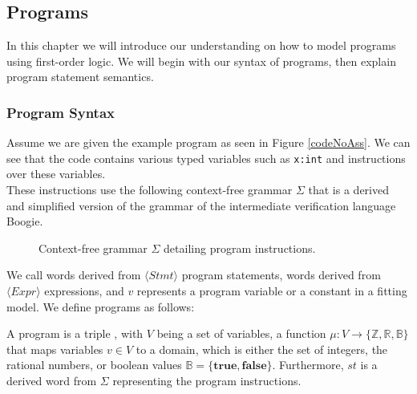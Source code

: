 \subsection{Programs}
In this chapter we will introduce our understanding on how to model programs using first-order logic. We will begin with our syntax of programs, then explain program statement semantics.

\subsubsection{Program Syntax}
Assume we are given the example program as seen in Figure \ref{codeNoAss}. We can see that the code contains various typed variables such as \texttt{x:int} and instructions over these variables. \\ These instructions use the following context-free grammar $\Sigma$ that is a derived and simplified version of the grammar of the intermediate verification language Boogie\cite{Boogie}.
\setlength{\grammarparsep}{20pt plus 1pt minus 1pt} %
\setlength{\grammarindent}{12em} %
\begin{figure}[H]
	
	\caption{Context-free grammar $\Sigma$ detailing program instructions.}
	\label{grmr}
\end{figure}
We call words derived from $\langle Stmt \rangle$ program statements, words derived from $\langle Expr \rangle$ expressions, and $v$ represents a program variable or a constant in a fitting model.
We define programs as follows:

\begin{mydef}[Programs]
	A program is a triple \prg, with $V$ being a set of variables, a function $\mu: V \rightarrow \{ \mathbb{Z}, \mathbb{R}, \mathbb{B} \}$ that maps variables $v \in V$ to a domain, which is either the set of integers, the rational numbers, or boolean values $\mathbb{B} = \{\textbf{true}, \textbf{false}\}$. Furthermore, $st$ is a derived word from $\Sigma$ representing the program instructions.
\end{mydef}
